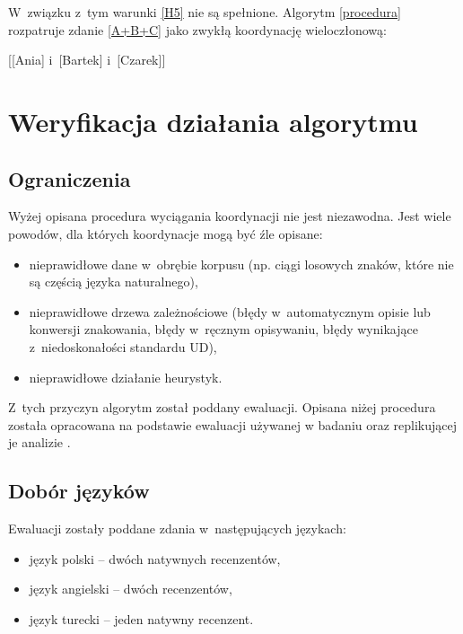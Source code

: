 W~związku z~tym warunki \ref{H5} nie są spełnione. Algorytm \eqref{procedura} rozpatruje zdanie \eqref{A+B+C} jako zwykłą koordynację wieloczłonową:

\begin{exe}
\ex \label{A+B+C-koordynacja}
{[[Ania] i~[Bartek] i~[Czarek]]}
\end{exe}

\section{Weryfikacja działania algorytmu}

\subsection{Ograniczenia}

Wyżej opisana procedura wyciągania koordynacji nie jest niezawodna. Jest wiele powodów, dla których koordynacje mogą być źle opisane:

\begin{itemize}
\item nieprawidłowe dane w~obrębie korpusu (np. ciągi losowych znaków, które nie są częścią języka naturalnego),
\item nieprawidłowe drzewa zależnościowe (błędy w~automatycznym opisie lub konwersji znakowania, błędy w~ręcznym opisywaniu, błędy wynikające z~niedoskonałości standardu UD),
\item nieprawidłowe działanie heurystyk.
\end{itemize}

Z~tych przyczyn algorytm został poddany ewaluacji. Opisana niżej procedura została opracowana na podstawie ewaluacji używanej w badaniu \cite{przepiorkowski2023conjunct} oraz replikującej je analizie \cite{przepiorkowski2024argument}.

\subsection{Dobór języków}

Ewaluacji zostały poddane zdania w~następujących językach:

\begin{itemize}
\item język polski -- dwóch natywnych recenzentów,
\item język angielski -- dwóch recenzentów,
\item język turecki -- jeden natywny recenzent.
\end{itemize}


